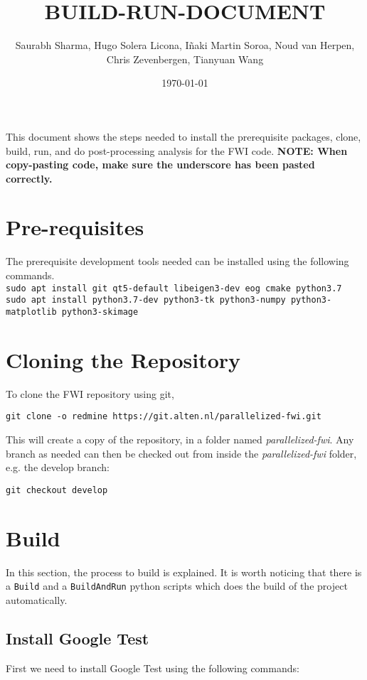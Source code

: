 \documentclass[10pt]{article}
\title{BUILD-RUN-DOCUMENT}
\author{Saurabh Sharma, Hugo Solera Licona, Iñaki Martin Soroa, Noud van Herpen, \\
Chris Zevenbergen, Tianyuan Wang}
\date{\today}
\begin{document}
\maketitle
\noindent This document shows the steps needed to install the prerequisite packages, clone, build, run, and do post-processing analysis for the FWI code. 
\newline
\newline\textbf{NOTE: When copy-pasting code, make sure the underscore has been pasted correctly.}

\section{Pre-requisites}
The prerequisite development tools needed can be installed using the following commands.\\

\noindent \texttt{sudo apt install git qt5-default libeigen3-dev eog cmake python3.7}\\
\texttt{sudo apt install python3.7-dev python3-tk python3-numpy python3-matplotlib python3-skimage}  


\section{Cloning the Repository}
\noindent To clone the FWI repository using git, 
\newline

\texttt{git clone -o redmine https://git.alten.nl/parallelized-fwi.git} 
\newline

This will create a copy of the repository, in a folder named \textit{parallelized-fwi}. Any branch as needed can then be checked out from inside the \textit{parallelized-fwi} folder, e.g. the develop branch: 
\newline

\texttt{git checkout develop}

\section{Build}
In this section, the process to build is explained. It is worth noticing that there is a \texttt{Build} and a \texttt{BuildAndRun} python scripts which does the build of the project automatically. 


\subsection{Install Google Test}
First we need to install Google Test using the following commands:
\newline
\end{document}
